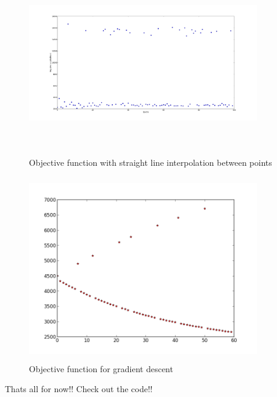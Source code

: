 \documentclass{article}
\begin{document}
  \begin{figure}[H]
   \centering
  \includegraphics[width=10cm, height=8cm]{finalDotGraph}
  \caption{Objective function with straight line interpolation between points}
  \end{figure}
  \begin{figure}[H]
   \centering
  \includegraphics[width=10cm, height=8cm]{gd60}
  \caption{Objective function for gradient descent}
  \end{figure}
  
 Thats all for now!! Check out the code!! 
\end{document}

